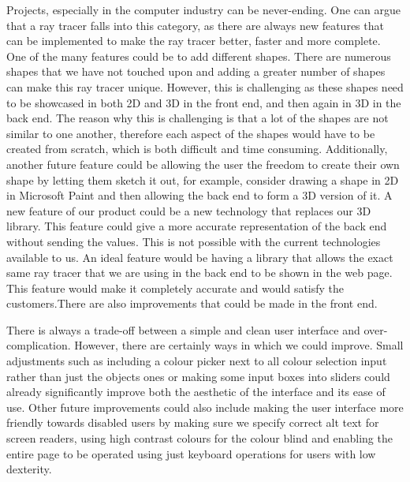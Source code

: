 \documentclass[a4paper]{report}
\begin{document}
	\par Projects, especially in the computer industry can be never-ending. One can argue that a ray tracer falls into this category, as there are always new features that can be implemented to make the ray tracer better, faster and more complete. One of the many features could be to add different shapes. There are numerous shapes that we have not touched upon and adding a greater number of shapes can make this ray tracer unique. However, this is challenging as these shapes need to be showcased in both 2D and 3D in the front end, and then again in 3D in the back end. The reason why this is challenging is that a lot of the shapes are not similar to one another, therefore each aspect of the shapes would have to be created from scratch, which is both difficult and time consuming. Additionally, another future feature could be allowing the user the freedom to create their own shape by letting them sketch it out, for example, consider drawing a shape in 2D in Microsoft Paint and then allowing the back end to form a 3D version of it. A new feature of our product could be a new technology that replaces our 3D library. This feature could give a more accurate representation of the back end without sending the values. This is not possible with the current technologies available to us. An ideal feature would be having a library that allows the exact same ray tracer that we are using in the back end to be shown in the web page. This feature would make it completely accurate and would satisfy the customers.There are also improvements that could be made in the front end.\newline
	
	\par There is always a trade-off between a simple and clean user interface and over-complication. However, there are certainly ways in which we could improve. Small adjustments such as including a colour picker next to all colour selection input rather than just the objects ones or making some input boxes into sliders could already significantly improve both the aesthetic of the interface and its ease of use. Other future improvements could also include making the user interface more friendly towards disabled users by making sure we specify correct alt text for screen readers, using high contrast colours for the colour blind and enabling the entire page to be operated using just keyboard operations for users with low dexterity. \newline
	
\end{document}

